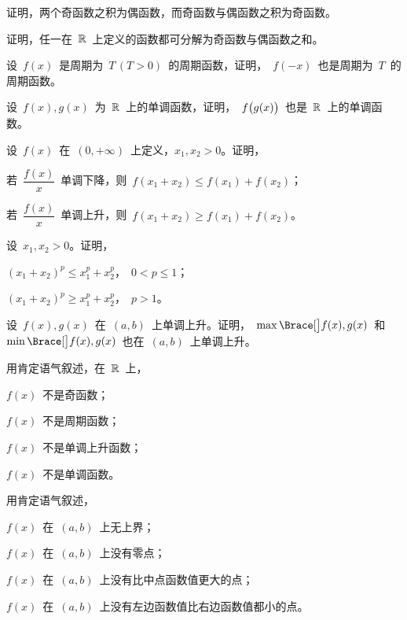 \begin{exercise}
\begin{exlist}
\end{exlist}
\item 证明，两个奇函数之积为偶函数，而奇函数与偶函数之积为奇函数。
\item 证明，任一在~$\mathbb{R}$~上定义的函数都可分解为奇函数与偶函数之和。
\item 设~$f(x)$~是周期为~$T\,(T>0)$~的周期函数，证明，~$f(-x)$~也是周期为~$T$~的周期函数。
\item 设~$f(x),g(x)$~为~$\mathbb{R}$~上的单调函数，证明，~$f\bigl\lparen g(x)\bigr\rparen$~也是~$\mathbb{R}$~上的单调函数。
\item 设~$f(x)$~在~$(0,+\infty)$~上定义，$x_1,x_2>0$。证明，
\begin{exlist}
  \item 若~$\dfrac{f(x)}x$~单调下降，则~$f(x_1+x_2)\leq f(x_1)+f(x_2)$；
  \item 若~$\dfrac{f(x)}x$~单调上升，则~$f(x_1+x_2)\geq f(x_1)+f(x_2)$。
\end{exlist}
\item 设~$x_1,x_2>0$。证明，
\begin{exlistcols}
  \item $(x_1+x_2)^p\leq x_1^p+x_2^p$，~$0<p\leq1$；
  \item $(x_1+x_2)^p\geq x_1^p+x_2^p$，~$p>1$。
\end{exlistcols}
\item 设~$f(x),g(x)$~在~$(a,b)$~上单调上升。证明，~$\max\Braceb{f(x),g(x)}$~和~$\min\Braceb{f(x),g(x)}$~也在~$(a,b)$~上单调上升。
\item 用肯定语气叙述，在~$\mathbb{R}$~上，
\begin{exlistcols}
  \item $f(x)$~不是奇函数；
  \item $f(x)$~不是周期函数；
  \item $f(x)$~不是单调上升函数；
  \item $f(x)$~不是单调函数。
\end{exlistcols}
\item 用肯定语气叙述，
\begin{exlistcols}
  \item $f(x)$~在~$(a,b)$~上无上界；
  \item $f(x)$~在~$(a,b)$~上没有零点；
  \item $f(x)$~在~$(a,b)$~上没有比中点函数值更大的点；
  \item $f(x)$~在~$(a,b)$~上没有左边函数值比右边函数值都小的点。
\end{exlistcols}
\end{exercise}

